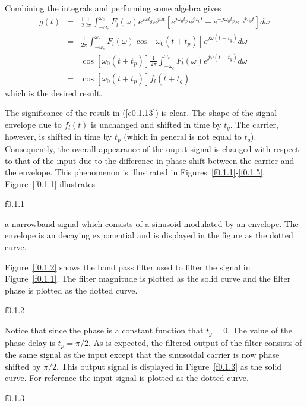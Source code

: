 %
Combining the integrals and performing some algebra gives
%
\begin{eqnarray}
g(t)&=&\frac{1}{2}\frac{1}{2\pi}\int_{-\omega_c}^{\omega_c}
       F_l(\omega)e^{j\omega t_g}e^{j\omega t}[e^{j\omega_0t_p}e^{j\omega_0t}
      +e^{-j\omega_0t_p}e^{-j\omega_0t}]d\omega\nonumber\\
    &=&\frac{1}{2\pi}\int_{-\omega_c}^{\omega_c}
       F_l(\omega)\cos[\omega_0(t+t_p)]
      e^{j\omega(t+t_g)}d\omega\nonumber\\
    &=&\cos[\omega_0(t+t_p)]\frac{1}{2\pi}\int_{-\omega_c}^{\omega_c}
       F_l(\omega)e^{j\omega(t+t_g)}d\omega\nonumber\\
    &=&\cos[\omega_0(t+t_p)]f_l(t+t_g)
\label{e0.1.13}
\end{eqnarray}
%
which is the desired result.

	The significance of the result in (\ref{e0.1.13}) is clear.
The shape of the signal envelope due to $f_l(t)$
is unchanged and shifted in time by $t_g$.  The carrier,
however, is shifted in time by $t_p$ (which in general
is not equal to $t_g$).  Consequently, the overall appearance of
the ouput signal is changed with respect to that of the input
due to the difference in phase shift between the carrier and
the envelope.  This phenomenon is illustrated in 
Figures~\ref{f0.1.1}-\ref{f0.1.5}.  Figure~\ref{f0.1.1} illustrates
%

{f0.1.1}

%
a narrowband signal which consists of a sinusoid modulated by an envelope.
The envelope is an decaying exponential and is displayed in the figure
as the dotted curve.  

	Figure~\ref{f0.1.2} shows the band pass filter
used to filter the signal in Figure~\ref{f0.1.1}.  The filter magnitude
is plotted as the solid curve and the filter phase is plotted as the 
dotted curve.  
%

{f0.1.2}

%
Notice that since the phase is a constant function that $t_g=0$.
The value of the phase delay is $t_p=\pi/2$.  As is expected, the
filtered output of the filter consists of the same signal as the 
input except that the sinusoidal carrier is now phase shifted by $\pi/2$.
This output signal is displayed in Figure~\ref{f0.1.3} as the solid
curve.  For reference the input signal is plotted as the dotted curve.
%

{f0.1.3}

